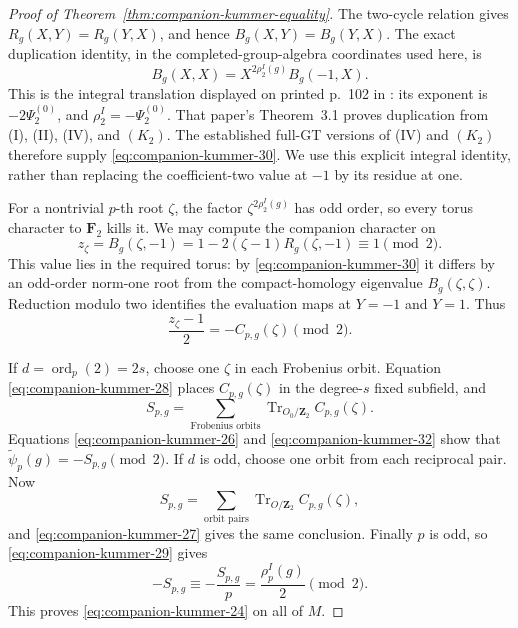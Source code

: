 \begin{proof}[Proof of Theorem~\ref{thm:companion-kummer-equality}]
The two-cycle relation gives \(R_g(X,Y)=R_g(Y,X)\), and hence
\(B_g(X,Y)=B_g(Y,X)\). The exact duplication identity, in the
completed-group-algebra coordinates used here, is
\begin{equation}
                  B_g(X,X)=X^{2\rho_2^I(g)}B_g(-1,X).
\label{eq:companion-kummer-30}
\end{equation}
This is the integral translation displayed on printed p.~102 in
\cite{Furusho2003}: its exponent is \(-2\Psi_2^{(0)}\), and
\(\rho_2^I=-\Psi_2^{(0)}\). That paper's Theorem~3.1 proves
duplication from (I), (II), (IV), and \((K_2)\). The established
full-GT versions of (IV) and \((K_2)\) therefore supply \eqref{eq:companion-kummer-30}.
We use this explicit integral identity, rather than replacing
the coefficient-two value at \(-1\) by its residue at one.

For a nontrivial \(p\)-th root \(\zeta\), the factor
\(\zeta^{2\rho_2^I(g)}\) has odd order, so every torus character
to \(\mathbf F_2\) kills it. We may compute the companion
character on
\begin{equation}
 z_\zeta=B_g(\zeta,-1)
           =1-2(\zeta-1)R_g(\zeta,-1)
           \equiv1\pmod2.                               
\label{eq:companion-kummer-31}
\end{equation}
This value lies in the required torus: by \eqref{eq:companion-kummer-30} it differs by an
odd-order norm-one root from the compact-homology eigenvalue
\(B_g(\zeta,\zeta)\). Reduction modulo two identifies the
evaluation maps at \(Y=-1\) and \(Y=1\). Thus
\begin{equation}
          \frac{z_\zeta-1}{2}
                   =-C_{p,g}(\zeta)\pmod2.               
\label{eq:companion-kummer-32}
\end{equation}

If \(d=\operatorname{ord}_p(2)=2s\), choose one \(\zeta\)
in each Frobenius orbit. Equation \eqref{eq:companion-kummer-28} places
\(C_{p,g}(\zeta)\) in the degree-\(s\) fixed subfield, and
\[
 S_{p,g}=\sum_{\text{Frobenius orbits}}
       \operatorname{Tr}_{O_0/\mathbf Z_2}C_{p,g}(\zeta).
\]
Equations \eqref{eq:companion-kummer-26} and \eqref{eq:companion-kummer-32} show that
\(\widetilde\psi_p(g)=-S_{p,g}\pmod2\).
If \(d\) is odd, choose one orbit from each reciprocal pair.
Now
\[
 S_{p,g}=\sum_{\text{orbit pairs}}
       \operatorname{Tr}_{O/\mathbf Z_2}C_{p,g}(\zeta),
\]
and \eqref{eq:companion-kummer-27} gives the same conclusion. Finally \(p\) is odd,
so \eqref{eq:companion-kummer-29} gives
\[
          -S_{p,g}\equiv-\frac{S_{p,g}}p
                    =\frac{\rho_p^I(g)}2\pmod2.
\]
This proves \eqref{eq:companion-kummer-24} on all of \(M\).
\end{proof}


